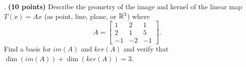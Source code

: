 \documentclass[12pt,a4paper]{article}
\newcommand{\gray}[1]{\textcolor{gray}{}}
\renewcommand{\l}{\left}
\renewcommand{\r}{\right}
\let\italiccorrection=\/
\def\/{\ifmmode\expandafter\frac\else\italiccorrection\fi}
\newcommand{\x}{\times}
\def\R{\ifmmode\mathbb R\fi}
\begin{document}
\newpage
{}. \textbf{(10 points)} Describe the geometry of the image and kernel of the linear map $T(x) = Ax$ (as point, line, plane, or $\R^3$) where 
$$A = \l[
\begin{array}{ccc}
    1 & 2 & 1 \\
    2 & 1 & 5 \\
    -1& -2& -1
\end{array}
\r].$$
Find a basis for $im(A)$ and $ker(A)$ and verify that $\dim(im(A)) + \dim(ker(A)) = 3$. \\
\gray{ 
	Note that $3a_1 - a_2 - a_3 = 0$ where $a_i$'s denote the columns of $A$. $im(T) = span(\{a_1, a_2\})$ is a plane, $ker(T) = span(\{(3, -1, -1)^T\})$ is a line.
}




\end{document}
